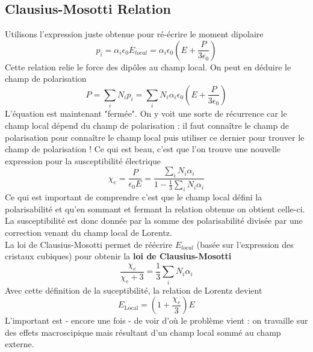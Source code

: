 \subsection{Clausius-Mosotti Relation}
Utilisons l'expression juste obtenue pour ré-écrire le moment dipolaire
\begin{equation}
p_i = \alpha_i\epsilon_0E_{local} = \alpha_i\epsilon_0\left(E+\dfrac{P}{3\epsilon_0}\right)
\end{equation}
Cette relation relie le force des dipôles au champ local. On peut en déduire le champ de polarisation
\begin{equation}
P = \sum_i N_i p_i = \sum_i N_i\alpha_i\epsilon_0\left(E+\dfrac{P}{3\epsilon_0}\right)
\end{equation}
L'équation est maintenant "fermée". On y voit une sorte de récurrence car le champ local dépend du champ de
polarisation : il faut connaître le 
champ de polarisation pour connaître le champ local puis utiliser ce dernier pour trouver le champ de
polarisation ! Ce qui est beau, c'est que l'on trouve une nouvelle expression pour la susceptibilité électrique
\begin{equation}
\chi_e = \frac{P}{\epsilon_0E}=\dfrac{\sum_i N_i\alpha_i}{1-\frac{1}{3}\sum_i N_i\alpha_i}
\end{equation}
Ce qui est important de comprendre c'est que le champ local défini la polarisabilité et qu'en sommant et 
fermant la relation obtenue on obtient celle-ci. La susceptibilité est donc donnée par la somme des 
polarisabilité divisée par une correction venant du champ local de Lorentz. \\

La loi de Clausius-Mosotti permet de réécrire $E_{local}$ (basée sur l'expression des cristaux cubiques) 
pour obtenir la \textbf{loi de Clausius-Mosotti}
\begin{equation}
\dfrac{\chi_e}{\chi_e+3}=\frac{1}{3}\sum_i N_i\alpha_i
\end{equation}
Avec cette définition de la suceptibilité, la relation de Lorentz devient
\begin{equation}
E_{\text{Local}} = \left(1+\dfrac{\chi_e}{3}\right)E
\end{equation}
L'important est - encore une fois - de voir d'où le problème vient : on travaille sur des effets macroscipique
mais résultant d'un champ local sommé au champ externe.


